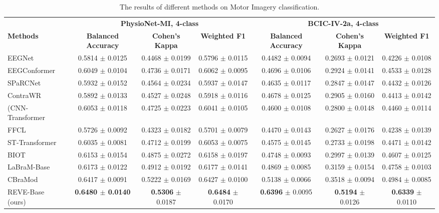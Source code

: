 \documentclass{article}
\begin{document}
\begin{table}[H]
\centering
\caption{The results of different methods on Motor Imagery classification.}



\tiny
\begin{tabular}{lcccccc} 
\toprule
&\multicolumn{3}{c}{\textbf{PhysioNet-MI, 4-class}}&\multicolumn{3}{c}{\textbf{BCIC-IV-2a, 4-class}}\\
\cmidrule(lr){2-4}\cmidrule(lr){5-7}
\textbf{Methods}&\textbf{Balanced Accuracy}&\textbf{Cohen’s Kappa}&\textbf{Weighted F1}&\textbf{Balanced Accuracy}&\textbf{Cohen’s Kappa}&\textbf{Weighted F1}\\
\midrule
EEGNet&0.5814 $\pm$ 0.0125&0.4468 $\pm$ 0.0199&0.5796 $\pm$ 0.0115&0.4482 $\pm$ 0.0094&0.2693 $\pm$ 0.0121&0.4226 $\pm$ 0.0108\\
EEGConformer& 0.6049 $\pm$ 0.0104& 0.4736 $\pm$ 0.0171& 0.6062 $\pm$ 0.0095& 0.4696 $\pm$ 0.0106& 0.2924 $\pm$ 0.0141& 0.4533 $\pm$ 0.0128\\
SPaRCNet&0.5932 $\pm$ 0.0152&0.4564 $\pm$ 0.0234&0.5937 $\pm$ 0.0147&0.4635 $\pm$ 0.0117&0.2847 $\pm$ 0.0147&0.4432 $\pm$ 0.0126\\
ContraWR& 0.5892 $\pm$ 0.0133& 0.4527 $\pm$ 0.0248& 0.5918 $\pm$ 0.0116& 0.4678 $\pm$ 0.0125& 0.2905 $\pm$ 0.0160& 0.4413 $\pm$ 0.0142\\
(CNN-Transformer& 0.6053 $\pm$ 0.0118& 0.4725 $\pm$ 0.0223& 0.6041 $\pm$ 0.0105& 0.4600 $\pm$ 0.0108& 0.2800 $\pm$ 0.0148& 0.4460 $\pm$ 0.0114\\
FFCL  &   0.5726 $\pm$ 0.0092& 0.4323 $\pm$ 0.0182& 0.5701 $\pm$ 0.0079& 0.4470 $\pm$ 0.0143& 0.2627 $\pm$ 0.0176& 0.4238 $\pm$ 0.0139\\
ST-Transformer & 0.6035 $\pm$ 0.0081& 0.4712 $\pm$ 0.0199&0.6053 $\pm$ 0.0075& 0.4575 $\pm$ 0.0145& 0.2733 $\pm$ 0.0198&0.4471 $\pm$ 0.0142\\
\midrule
BIOT&0.6153 $\pm$ 0.0154&0.4875 $\pm$ 0.0272&0.6158 $\pm$ 0.0197& 0.4748 $\pm$ 0.0093&0.2997 $\pm$ 0.0139& 0.4607 $\pm$ 0.0125\\
LaBraM-Base&0.6173 $\pm$ 0.0122&0.4912 $\pm$ 0.0192&0.6177 $\pm$ 0.0141&0.4869 $\pm$ 0.0085&0.3159 $\pm$ 0.0154&0.4758 $\pm$ 0.0103\\
CBraMod &0.6417 $\pm$ 0.0091& 0.5222 $\pm$ 0.0169& 0.6427 $\pm$ 0.0100& 0.5138 $\pm$ 0.0066& 0.3518 $\pm$ 0.0094&0.4984 $\pm$ 0.0085\\
\midrule
REVE-Base (ours)&\textbf{0.6480 $\pm$ 0.0140}&\textbf{0.5306} $\pm$ 0.0187&\textbf{0.6484} $\pm$ 0.0170& \textbf{0.6396} $\pm$ 0.0095& \textbf{0.5194} $\pm$ 0.0126& \textbf{0.6339} $\pm$ 0.0110\\
\bottomrule
\end{tabular}
\label{tab:merged_app}
\end{table}
\end{document}
